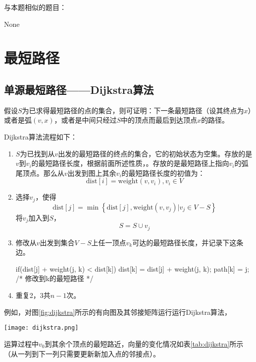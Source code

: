 与本题相似的题目：
\begindot
\item None
\myenddot


\section{最短路径} %

\subsection{单源最短路径——Dijkstra算法}
\label{sec:dijkstra}

假设$S$为已求得最短路径的点的集合，则可证明：下一条最短路径（设其终点为$x$）或者是弧$(v, x)$，或者是中间只经过$S$中的顶点而最后到达顶点$x$的路径。

Dijkstra算法流程如下：
\begin{enumerate}
\item $S$为已找到从$v$出发的最短路径的终点的集合，它的初始状态为空集。存放的是$v$到$v_i$的最短路径长度，根据前面所述性质，。存放的是最短路径上指向$v_i$的弧尾顶点。那么从$v$出发到图上其余$v_i$的最短路径长度的初值为：
$$
\text{dist}[i] = \text{weight}(v, v_i), v_i \in V
$$
\item 选择$v_j$，使得
$$
\text{dist}[j]=\min\left\{\text{dist}[j], \text{weight}(v, v_j)|v_j \in V-S\right\}
$$
将$v_j$加入到$S$，
$$
S = S \cup {v_j}
$$
\item 修改从$v$出发到集合$V-S$上任一顶点$v_k$可达的最短路径长度，并记录下这条边。
\begin{Code}
if(dist[j] + weight(j, k) < dist[k]) {
    dist[k] = dist[j] + weight(j, k);
    path[k] = j; /* 修改到k的最短路径 */
}
\end{Code}
\item 重复2，3共$n-1$次。
\end{enumerate}

例如，对图\ref{fig:dijkstra}所示的有向图及其邻接矩阵运行运行Dijkstra算法，

\begin{center}
\texttt{[image: dijkstra.png]}\\
\label{fig:dijkstra}
\end{center}

运算过程中$v_0$到其余个顶点的最短路近，向量的变化情况如表\ref{tab:dijkstra}所示（从一列到下一列只需要更新新加入点的邻接点）。

